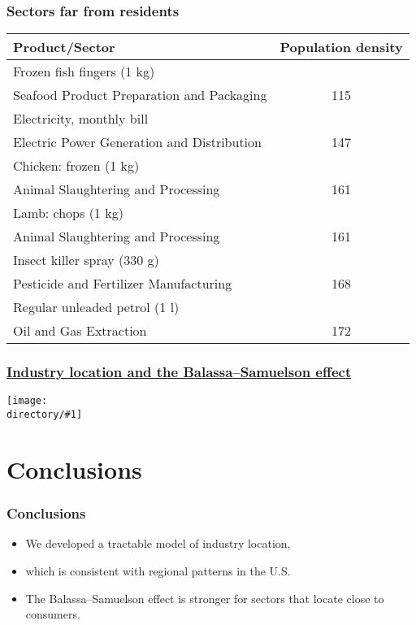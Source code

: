 \documentclass[compress,mathserif]{beamer}
\newcounter{perc}
\newcounter{percek}
\newcommand{\directory}{figures}
\newcommand{\widefigure}[2]{\begin{frame}\frametitle{\hyperlink{#1back}{#2}}\hypertarget{#1}{{\begin{center}\label{#1}\texttt{[image: \\directory/\#1]}\end{center}}}\end{frame}}
\renewcommand{\time}[1]{\addtocounter{percek}{#1}}
\begin{document}
\begin{frame}\frametitle{Sectors far from residents}
\begin{center}
\begin{tabular}{lc}
  \hline
  Product/Sector & Population density\\
  \hline
  Frozen fish fingers (1 kg)\\
  \hspace*{1em}Seafood Product Preparation and Packaging &115\\
  Electricity, monthly bill\\
  \hspace*{1em}Electric Power Generation and Distribution & 147\\
  Chicken: frozen (1 kg)\\
  \hspace*{1em}Animal Slaughtering and Processing & 161\\
  Lamb: chops (1 kg)\\
  \hspace*{1em}Animal Slaughtering and Processing & 161\\
  Insect killer spray (330 g)\\
  \hspace*{1em}Pesticide and Fertilizer Manufacturing & 168\\
  Regular unleaded petrol (1 l)\\
  \hspace*{1em}Oil and Gas Extraction & 172\\
  \hline
\end{tabular}
\end{center}
\end{frame}
\time 4

\widefigure{eiureg}{Industry location and the Balassa--Samuelson effect}
\time 3

\time 2

\section{Conclusions}
\begin{frame}\frametitle{Conclusions}
\label{conclusion}
\begin{itemize}
\item We developed a tractable model of industry location,
\item which is consistent with regional patterns in the U.S.
\item The Balassa--Samuelson effect is stronger for sectors that locate close to consumers.
\end{itemize}
\end{frame}
\end{document}
